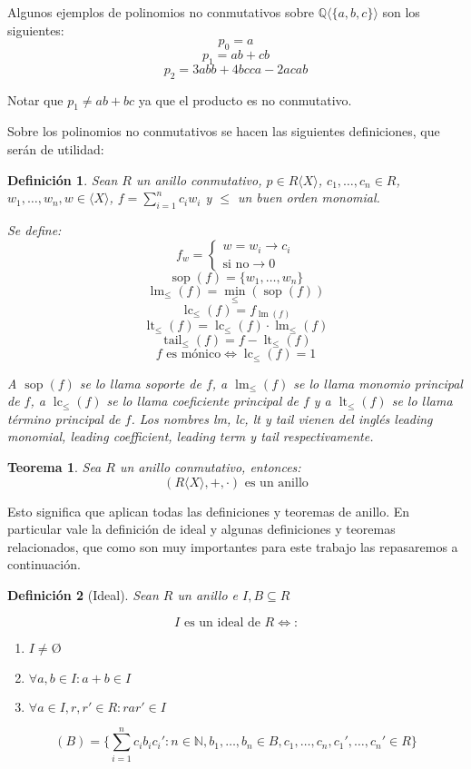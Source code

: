 \documentclass[fleqn]{amsbook} %
\theoremstyle{customstyle}
\newtheorem{definition}{Definición}[section]
\newtheorem{theorem}{Teorema}[section]
\DeclareMathOperator{\sop}{sop}
\DeclareMathOperator{\lm}{lm}
\DeclareMathOperator{\lc}{lc}
\DeclareMathOperator{\lt}{lt}
\DeclareMathOperator{\tail}{tail}
\begin{document}
Algunos ejemplos de polinomios no conmutativos sobre $ℚ⟨\{a, b, c\}⟩$ son los siguientes:
\[ p_0 = a \]
\[ p_1 = ab + cb \]
\[ p_2 = 3 abb + 4 bcca - 2 acab \]

Notar que $p_1 ≠ ab + bc$ ya que el producto es no conmutativo.

Sobre los polinomios no conmutativos se hacen las siguientes definiciones, que serán de utilidad:

\begin{definition}
Sean $R$ un anillo conmutativo, $p ∈ R⟨X⟩$, $c_1, …, c_n ∈ R$, $w_1, …, w_n, w ∈ ⟨X⟩$, $f = ∑_{i = 1}^n c_i w_i$ y $≤$ un buen orden monomial.

Se define:
\[ f_w = \left\{\begin{array}{ll} w = w_i → c_i \\ \text{si no} → 0  \end{array} \right. \]
\[ \sop(f) = \{w_1, …, w_n\} \]
\[ \lm_≤(f) = \min_≤(\sop(f)) \]
\[ \lc_≤(f) = f_{\lm(f)} \]
\[ \lt_≤(f) = \lc_≤(f) · \lm_≤(f) \]
\[ \tail_≤(f) = f - \lt_≤(f) \]
\[ f\text{ es mónico} ⇔ \lc_≤(f) = 1 \]

A $\sop(f)$ se lo llama soporte de $f$, a $\lm_≤(f)$ se lo llama monomio principal de $f$, a $\lc_≤(f)$ se lo llama coeficiente principal de $f$ y a $\lt_≤(f)$ se lo llama término principal de $f$. Los nombres lm, lc, lt y tail vienen del inglés leading monomial, leading coefficient, leading term y tail respectivamente.

\end{definition}

\begin{theorem}
Sea $R$ un anillo conmutativo, entonces:
\[ (R⟨X⟩, +, ·)\text{ es un anillo} \]
\end{theorem}

Esto significa que aplican todas las definiciones y teoremas de anillo.
En particular vale la definición de ideal y algunas definiciones y teoremas relacionados, que como son muy importantes para este trabajo las repasaremos a continuación.

\begin{definition}[Ideal]\label{def:ideal}
Sean $R$ un anillo e $I, B ⊆ R$

\[ I\text{ es un ideal de }R ⇔\text{:} \]
\begin{enumerate}[label = (\alph*)]
\item $I ≠ Ø$

\item $∀a, b ∈ I : a + b ∈ I$

\item $∀a ∈ I, r, r' ∈ R : r a r' ∈ I$
\end{enumerate}

\[ (B) = \{∑_{i = 1}^n c_i b_i c_i' : n ∈ ℕ, b_1, …, b_n ∈ B, c_1, …, c_n, c_1', …, c_n' ∈ R\} \]
\end{definition}
\end{document}
